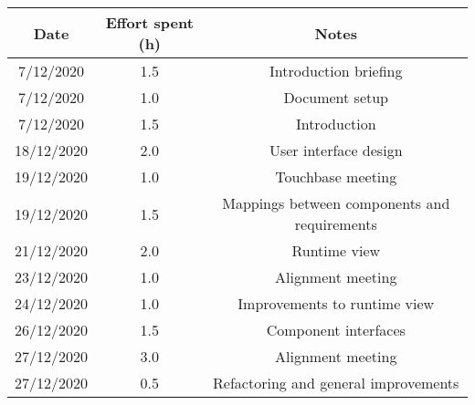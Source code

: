 \documentclass[../../main.tex]{subfiles}
\begin{document}
\begin{center}
    \begin{tabular}{|c| |c| |c|} 
        \hline
        Date & Effort spent (h) & Notes\\ [0.5ex] 
        \hline\hline
        7/12/2020 & 1.5 & Introduction briefing\\ 
        7/12/2020 & 1.0 & Document setup\\
        7/12/2020 & 1.5 & Introduction\\
        18/12/2020 & 2.0 & User interface design\\
        19/12/2020 & 1.0 & Touchbase meeting\\
        19/12/2020 & 1.5 & Mappings between components and requirements\\
        21/12/2020 & 2.0 & Runtime view\\
        23/12/2020 & 1.0 & Alignment meeting\\
        24/12/2020 & 1.0 & Improvements to runtime view\\
        26/12/2020 & 1.5 & Component interfaces\\
        27/12/2020 & 3.0 & Alignment meeting\\
        27/12/2020 & 0.5 & Refactoring and general improvements\\
        \hline
    \end{tabular}
\end{center}
\end{document}
